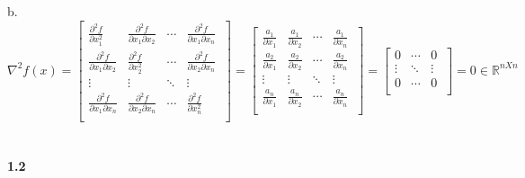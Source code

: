 \documentclass[fleqn]{article}
\begin{document}
b. \\
\[
\nabla^2 f(x) = \begin{bmatrix} 
\frac{\partial^2 f}{\partial x_1^2} & \frac{\partial^2 f}{\partial x_1 \partial x_2} & \cdots & \frac{\partial^2 f}{\partial x_1 \partial x_n}\
\\ 
\frac{\partial^2 f}{\partial x_1 \partial x_2} & \frac{\partial^2 f}{\partial x_2^2} & \cdots & \frac{\partial^2 f}{\partial x_2 \partial x_n}
\\ 
\vdots & \vdots & \ddots & \vdots
\\ 
\frac{\partial^2 f}{\partial x_1 \partial x_n} & \frac{\partial^2 f}{\partial x_2 \partial x_n} & \cdots & \frac{\partial^2 f}{\partial x_n^2}
\\ 
				\end{bmatrix}
=
\begin{bmatrix} 
\frac{a_1}{\partial x_1} & \frac{a_1}{\partial x_2} & \cdots & \frac{a_1}{\partial x_n}\
\\ 
\frac{a_2}{\partial x_1} & \frac{a_2}{\partial x_2} & \cdots & \frac{a_2}{\partial x_n}
\\ 
\vdots & \vdots & \ddots & \vdots
\\ 
\frac{a_n}{\partial x_1} & \frac{a_n}{\partial x_2} & \cdots & \frac{a_n}{\partial x_n}
\\ 
\end{bmatrix}
= 	
\begin{bmatrix} 
0 & \cdots & 0\
\\ 
\vdots & \ddots & \vdots
\\ 
0 & \cdots & 0\
\\ 
\end{bmatrix}
=	
0 \in \mathbb{R}^{nXn}
\]\\ \\

\textbf{1.2} \\ \\
\end{document}
